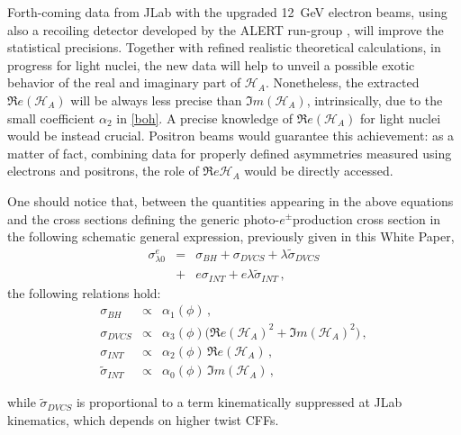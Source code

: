 \documentclass[times, twoside]{PosWhiPap}
\begin{document}
Forth-coming data from JLab with the upgraded 12~GeV electron beams, using also 
a recoiling  detector developed by the ALERT run-group 
\cite{Armstrong:2017wfw}, will improve the statistical precisions. Together 
with refined realistic theoretical calculations, in progress for light nuclei,
the new data will help to unveil a possible exotic behavior of the real and 
imaginary part of $\mathcal{H}_{A}$. Nonetheless, the extracted $\Re 
e(\mathcal{H}_{A})$ will be always less precise than $\Im m(\mathcal{H}_{A})$, 
intrinsically, due to the small coefficient $\alpha_2$ in \eqref{boh}.
A precise knowledge of $\Re e(\mathcal{H}_{A})$ for light nuclei would be 
instead crucial. Positron beams would guarantee this achievement: as a matter 
of fact, combining data for properly defined asymmetries measured using 
electrons and positrons, the role of $\Re e \mathcal{H}_{A}$ would be directly 
accessed.

One should notice that, between the quantities appearing in the above
equations and the cross sections defining the generic photo-$e^\pm$production 
cross section in the following schematic general expression, previously given 
in this White Paper,
\begin{eqnarray}
\sigma^e_{\lambda 0}  & = & \sigma_{BH} + \sigma_{DVCS} + \lambda \tilde \sigma_{DVCS} 
\nonumber
\\
& + & e\sigma_{INT} + e \lambda \tilde \sigma_{INT} \, ,
\label{gen}
\end{eqnarray}
the following relations hold:
\begin{eqnarray}
\sigma_{BH} & \propto & \alpha_1(\phi)\, ,
\nonumber \\
\sigma_{DVCS} & \propto &   \alpha_{3}(\phi) 
\big( \Re e(\mathcal{H}_{A})^{2} + \Im m(\mathcal{H}_{A})^{2} \big) \, ,
\nonumber \\
\sigma_{INT} & \propto & \alpha_{2}(\phi) \, \Re e(\mathcal{H}_{A}) \, ,
\nonumber \\
\tilde \sigma_{INT} & \propto & \alpha_{0}(\phi) \, \Im m(\mathcal{H}_{A}) \, ,
\end{eqnarray}

while $\tilde \sigma_{DVCS} $ is proportional to a term kinematically suppressed
at JLab kinematics, which depends on higher twist CFFs. 
\end{document}

